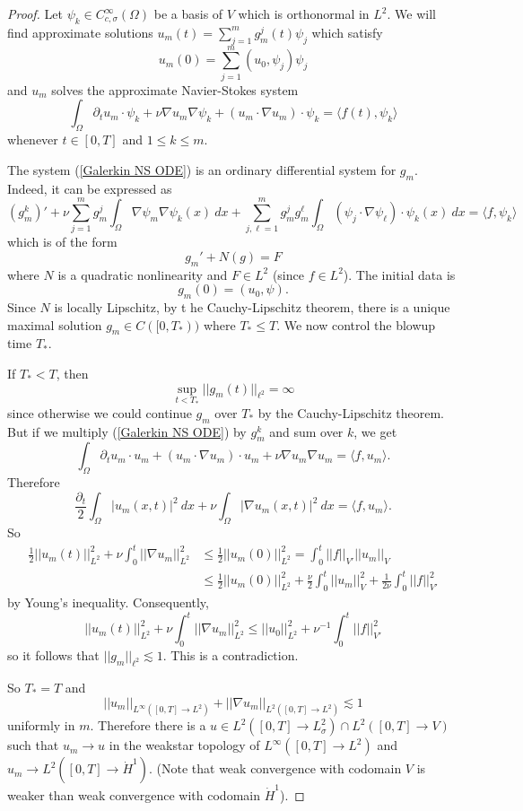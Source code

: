 \documentclass[12pt]{book}
\theoremstyle{definition}
\begin{document}
\begin{proof}
Let $\psi_k \in C^\infty_{c,\sigma}(\Omega)$ be a basis of $V$ which is orthonormal in $L^2$.
We will find approximate solutions $u_m(t) = \sum_{j=1}^m g_m^j(t) \psi_j$ which satisfy
$$u_m(0) = \sum_{j=1}^m (u_0, \psi_j)\psi_j$$
and $u_m$ solves the approximate Navier-Stokes system
\begin{equation}
\label{Galerkin NS ODE}
\int_\Omega \partial_t u_m \cdot \psi_k + \nu \nabla u_m \nabla \psi_k + (u_m \cdot \nabla u_m) \cdot \psi_k = \langle f(t), \psi_k\rangle
\end{equation}
whenever $t \in [0, T]$ and $1 \leq k \leq m$.

The system (\ref{Galerkin NS ODE}) is an ordinary differential system for $g_m$.
Indeed, it can be expressed as
$$(g^k_m)' + \nu \sum_{j=1}^m g_m^j \int_\Omega \nabla \psi_m \nabla \psi_k(x) ~dx + \sum_{j,\ell=1}^m g_m^j g_m^\ell \int_\Omega (\psi_j \cdot \nabla \psi_\ell) \cdot \psi_k(x) ~dx = \langle f, \psi_k\rangle$$
which is of the form
$$g_m' + N(g) = F$$
where $N$ is a quadratic nonlinearity and $F \in L^2$ (since $f \in L^2$).
The initial data is
$$g_m(0) = (u_0, \psi).$$
Since $N$ is locally Lipschitz, by t  he Cauchy-Lipschitz theorem, there is a unique maximal solution $g_m \in C([0, T_*))$ where $T_* \leq T$.
We now control the blowup time $T_*$.

If $T_* < T$, then
$$\sup_{t < T_*} ||g_m(t)||_{\ell^2} = \infty$$
since otherwise we could continue $g_m$ over $T_*$ by the Cauchy-Lipschitz theorem.
But if we multiply (\ref{Galerkin NS ODE}) by $g_m^k$ and sum over $k$,
we get
$$\int_\Omega \partial_t u_m \cdot u_m + (u_m \cdot \nabla u_m) \cdot u_m + \nu \nabla u_m \nabla u_m = \langle f, u_m\rangle.$$
Therefore
$$\frac{\partial_t}{2} \int_\Omega |u_m(x, t)|^2 ~dx + \nu \int_\Omega |\nabla u_m(x, t)|^2 ~dx = \langle f, u_m\rangle.$$
So
\begin{align*}
\frac{1}{2} ||u_m(t)||_{L^2}^2 + \nu\int_0^t ||\nabla u_m||_{L^2}^2 &\leq \frac{1}{2} ||u_m(0)||_{L^2}^2 = \int_0^t ||f||_{V'} ||u_m||_V\\
&\leq \frac{1}{2} ||u_m(0)||_{L^2}^2 + \frac{\nu}{2} \int_0^t ||u_m||_V^2 + \frac{1}{2\nu} \int_0^t ||f||_{V'}^2
\end{align*}
by Young's inequality.
Consequently,
$$||u_m(t)||_{L^2}^2 + \nu\int_0^t ||\nabla u_m||_{L^2}^2 \leq ||u_0||_{L^2}^2 + \nu^{-1} \int_0^t ||f||_{V'}^2$$
so it follows that $||g_m||_{\ell^2} \lesssim 1$.
This is a contradiction.

So $T_* = T$ and
$$||u_m||_{L^\infty([0, T] \to L^2)} + ||\nabla u_m||_{L^2([0, T] \to L^2)} \lesssim 1$$
uniformly in $m$.
Therefore there is a $u \in L^2([0, T] \to L^2_\sigma) \cap L^2([0, T] \to V)$ such that $u_m \to u$ in the weakstar topology of $L^\infty([0, T] \to L^2)$ and $u_m \to L^2([0, T] \to \dot H^1)$.
(Note that weak convergence with codomain $V$ is weaker than weak convergence with codomain $\dot H^1$).


\end{proof}
\end{document}
